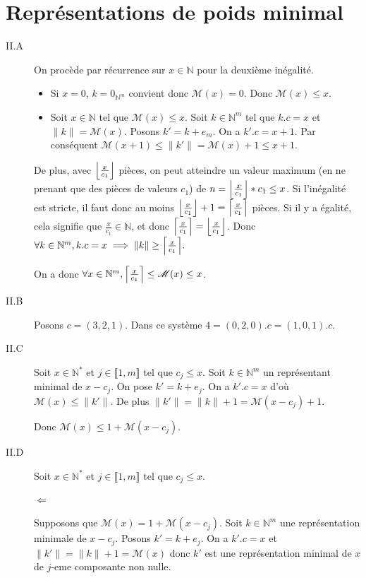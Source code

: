 \documentclass{article}
\newcommand{\N}{\mathbb{N}}
\newcommand{\M}{\mathscr{M}}
\newcommand{\norm}[1]{\|#1\|}
\newcommand{\scal}{.}
\newcommand{\seg}[2]{\llbracket #1, #2 \rrbracket}
\DeclarePairedDelimiter{\ceil}{\lceil}{\rceil}
\DeclarePairedDelimiter{\floor}{\lfloor}{\rfloor}
\begin{document}
\section{Représentations de poids minimal}
\begin{description}
    \item[II.A] On procède par récurrence sur $x\in\N$ pour la deuxième inégalité.
        \begin{itemize}
            \item Si $x=0$, $k = 0_{\N^m}$ convient donc $\M(x) = 0$. Donc $\M(x) \leq x$.
            \item Soit $x\in\N$ tel que $\M(x)\leq x$. Soit $k\in\N^m$ tel que $k\scal c = x$ et $\norm{k} = \M(x)$. Posons $k' = k + e_m$. On a $k'\scal c = x+1$. Par conséquent $\M(x+1)\leq \norm{k'} = \M(x) + 1 \leq x+1$.
        \end{itemize}

        De plus, avec $\floor*{\frac{x}{c_1}}$ pièces, on peut atteindre un valeur maximum (en ne prenant que des pièces de valeurs $c_1$) de $n = \floor*{\frac{x}{c_1}} * c_1 \leq x$. Si l'inégalité est stricte, il faut donc au moins $\floor*{\frac{x}{c_1}} + 1 = \ceil*{\frac{x}{c_1}}$ pièces. Si il y a égalité, cela signifie que $\frac{x}{c_1} \in\N$, et donc $\ceil*{\frac{x}{c_1}} = \floor*{\frac{x}{c_1}}$. Donc $\forall k\in\N^m, k.c = x \implies \norm{k} \geq \ceil*{\frac{x}{c_1}}.$

        On a donc $\forall x \in\N^m, \ceil*{\frac{x}{c_1}} \leq \M(x) \leq x$.

    \item[II.B] Posons $c = (3,2,1)$. Dans ce système $4 = (0,2,0)\scal c = (1,0,1)\scal c$.

    \item[II.C] Soit $x\in\N^*$ et $j\in\seg{1}{m}$ tel que $c_j\leq x$. Soit $k\in\N^m$ un représentant minimal de $x-c_j$. On pose $k' = k + e_j$. On a $k'\scal c = x$ d'où $\M(x) \leq \norm{k'}$. De plus $\norm{k'} = \norm{k} + 1 = \M(x-c_j) + 1$.

        Donc $\M(x) \leq 1 + \M(x-c_j)$.

    \item[II.D] Soit $x\in\N^*$ et $j\in\seg{1}{m}$ tel que $c_j\leq x$.
        \paragraph{$\Leftarrow$} Supposons que $\M(x) = 1 + \M(x-c_j)$. Soit $k\in\N^m$ une représentation minimale de $x-c_j$. Posons $k' = k + e_j$. On a $k'\scal c = x$ et $\norm{k'} = \norm{k} + 1 = \M(x)$ donc $k'$ est une représentation minimal de $x$ de $j$-eme composante non nulle.

\end{description}
\end{document}
